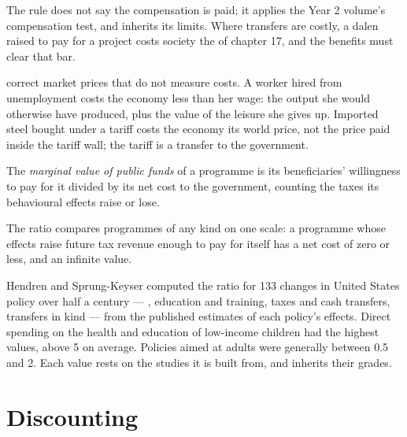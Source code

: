 The rule does not say the compensation is paid; it applies the Year 2 volume's
compensation test, and inherits its limits. Where transfers are costly, a dalen
raised to pay for a project costs society the  of
chapter 17, and the benefits must clear that bar.

 correct market prices that do not measure costs. A worker hired
from unemployment costs the economy less than her wage: the output she would
otherwise have produced, plus the value of the leisure she gives up. Imported
steel bought under a tariff costs the economy its world price, not the price paid
inside the tariff wall; the tariff is a transfer to the government.

\begin{definition}\label{def:b3:cost-benefit-analysis:mvpf}
The \emph{marginal value of public funds} of a programme is its beneficiaries'
willingness to pay for it divided by its net cost to the government, counting the
taxes its behavioural effects raise or lose.
\end{definition}

The ratio compares programmes of any kind on one scale: a programme whose effects
raise future tax revenue enough to pay for itself has a net cost of zero or less, and
an infinite value.

\begin{record}
Hendren and Sprung-Keyser computed the ratio for 133 changes in United States
policy over half a century --- , education and training, taxes and
cash transfers, transfers in kind --- from the published estimates of each policy's
effects. Direct spending on the health and education of low-income children had the
highest values, above 5 on average. Policies aimed at adults were
generally between 0.5 and 2. %
Each value rests on the studies it is built from, and inherits their grades.
\end{record}

\section{Discounting}\label{sec:b3:cost-benefit-analysis:discounting}

